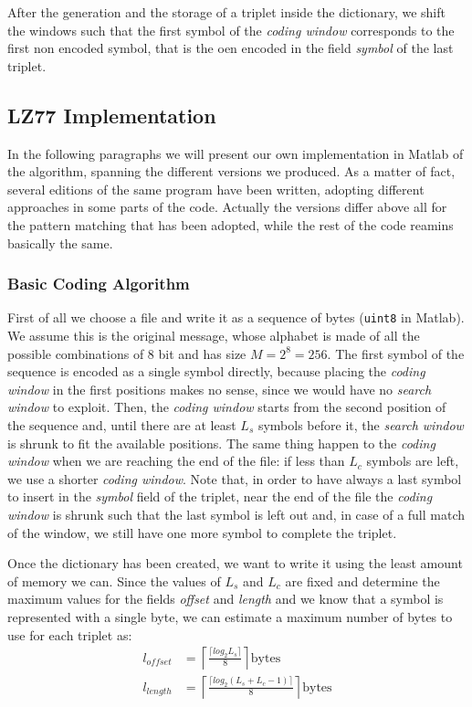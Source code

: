 After the generation and the storage of a triplet inside the dictionary, we shift the windows such that the first symbol of the \textit{coding window} corresponds to the first non encoded symbol, that is the oen encoded in the field \textit{symbol} of the last triplet.

\subsection{LZ77 Implementation} \label{subsec:lz77implem}
In the following paragraphs we will present our own implementation in Matlab of the algorithm, spanning the different versions we produced. As a matter of fact, several editions of the same program have been written, adopting different approaches in some parts of the code. Actually the versions differ above all for the pattern matching that has been adopted, while the rest of the code reamins basically the same.

\subsubsection{Basic Coding Algorithm} \label{subsubsec:basiclz77}
First of all we choose a file and write it as a sequence of bytes (\texttt{uint8} in Matlab). We assume this is the original message, whose alphabet is made of all the possible combinations of $8$ bit and has size $M = 2^8 = 256$. The first symbol of the sequence is encoded as a single symbol directly, because placing the \textit{coding window} in the first positions makes no sense, since we would have no \textit{search window} to exploit. Then, the \textit{coding window} starts from the second position of the sequence and, until there are at least $L_s$ symbols before it, the \textit{search window} is shrunk to fit the available positions. The same thing happen to the \textit{coding window} when we are reaching the end of the file: if less than $L_c$ symbols are left, we use a shorter \textit{coding window}. Note that, in order to have always a last symbol to insert in the \textit{symbol} field of the triplet, near the end of the file the \textit{coding window} is shrunk such that the last symbol is left out and, in case of a full match of the window, we still have one more symbol to complete the triplet.

Once the dictionary has been created, we want to write it using the least amount of memory we can. Since the values of $L_s$ and $L_c$ are fixed and determine the maximum values for the fields \textit{offset} and \textit{length} and we know that a symbol is represented with a single byte, we can estimate a maximum number of bytes to use for each triplet as:
\begin{align}
l_{offset} &= \left \lceil \frac{\lceil log_2L_s \rceil}{8} \right \rceil \text{bytes} \\
l_{length} &= \left \lceil \frac{\lceil log_2(L_s + L_c - 1) \rceil }{8} \right \rceil \text{bytes} 
\end{align}

